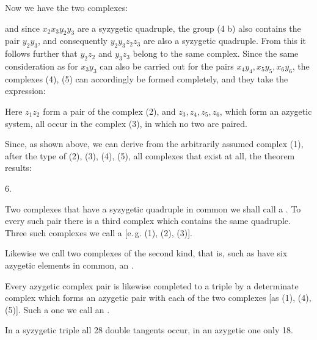 Now we have the two complexes:


and since $x_2 x_3 y_2 y_3$ are a syzygetic quadruple, the group (4 b) also contains the pair $y_2 y_3$, and consequently $y_2 y_3 z_2 z_3$ are also a syzygetic quadruple. From this it follows further that $y_2 z_2$ and $y_3 z_3$ belong to the same complex. Since the same consideration as for $x_3 y_3$ can also be carried out for the pairs $x_4 y_4, x_5 y_5, x_6 y_6$, the complexes (4), (5) can accordingly be formed completely, and they take the expression:


Here $z_1 z_2$ form a pair of the complex (2), and $z_3, z_4, z_5, z_6$, which form an azygetic system, all occur in the complex (3), in which no two are paired.

Since, as shown above, we can derive from the arbitrarily assumed complex (1), after the type of (2), (3), (4), (5), all complexes that exist at all, the theorem results:

6. 

Two complexes that have a syzygetic quadruple in common we shall call a . To every such pair there is a third complex which contains the same quadruple. Three such complexes we call a  [e.\,g. (1), (2), (3)].

Likewise we call two complexes of the second kind, that is, such as have six azygetic elements in common, an .

Every azygetic complex pair is likewise completed to a triple by a determinate complex which forms an azygetic pair with each of the two complexes [as (1), (4), (5)]. Such a one we call an .

In a syzygetic triple all 28 double tangents occur, in an azygetic one only 18.
